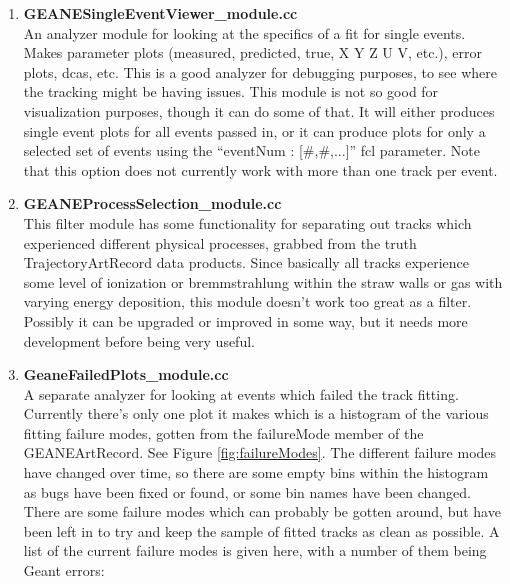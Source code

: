 \begin{enumerate}
      \item{\bf{GEANESingleEventViewer\_module.cc}} \\
      An analyzer module for looking at the specifics of a fit for single events. Makes parameter plots (measured, predicted, true, X Y Z U V, etc.), error plots, dcas, etc. This is a good analyzer for debugging purposes, to see where the tracking might be having issues. This module is not so good for visualization purposes, though it can do some of that. It will either produces single event plots for all events passed in, or it can produce plots for only a selected set of events using the ``eventNum : [\#,\#,...]'' fcl parameter. Note that this option does not currently work with more than one track per event.

      \item{\bf{GEANEProcessSelection\_module.cc}} \\
      This filter module has some functionality for separating out tracks which experienced different physical processes, grabbed from the truth TrajectoryArtRecord data products. Since basically all tracks experience some level of ionization or bremmstrahlung within the straw walls or gas with varying energy deposition, this module doesn't work too great as a filter. Possibly it can be upgraded or improved in some way, but it needs more development before being very useful.

      \item{\bf{GeaneFailedPlots\_module.cc}} \\
      A separate analyzer for looking at events which failed the track fitting. Currently there's only one plot it makes which is a histogram of the various fitting failure modes, gotten from the failureMode member of the GEANEArtRecord. See Figure \ref{fig:failureModes}. The different failure modes have changed over time, so there are some empty bins within the histogram as bugs have been fixed or found, or some bin names have been changed. There are some failure modes which can probably be gotten around, but have been left in to try and keep the sample of fitted tracks as clean as possible. A list of the current failure modes is given here, with a number of them being Geant errors:

        \begin{itemize}


\end{itemize}
\end{enumerate}
